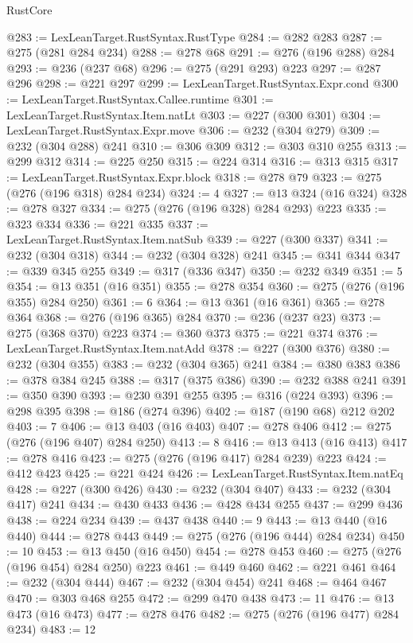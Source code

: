 \begin{lexlean}{RustCore}
\begin{coremodule}
@283 := LexLeanTarget.RustSyntax.RustType
@284 := @282 @283
@287 := @275 (@281 @284 @234)
@288 := @278 @68
@291 := @276 (@196 @288) @284
@293 := @236 (@237 @68)
@296 := @275 (@291 @293) @223
@297 := @287 @296
@298 := @221 @297
@299 := LexLeanTarget.RustSyntax.Expr.cond
@300 := LexLeanTarget.RustSyntax.Callee.runtime
@301 := LexLeanTarget.RustSyntax.Item.natLt
@303 := @227 (@300 @301)
@304 := LexLeanTarget.RustSyntax.Expr.move
@306 := @232 (@304 @279)
@309 := @232 (@304 @288) @241
@310 := @306 @309
@312 := @303 @310 @255
@313 := @299 @312
@314 := @225 @250
@315 := @224 @314
@316 := @313 @315
@317 := LexLeanTarget.RustSyntax.Expr.block
@318 := @278 @79
@323 := @275 (@276 (@196 @318) @284 @234)
@324 := 4
@327 := @13 @324 (@16 @324)
@328 := @278 @327
@334 := @275 (@276 (@196 @328) @284 @293) @223
@335 := @323 @334
@336 := @221 @335
@337 := LexLeanTarget.RustSyntax.Item.natSub
@339 := @227 (@300 @337)
@341 := @232 (@304 @318)
@344 := @232 (@304 @328) @241
@345 := @341 @344
@347 := @339 @345 @255
@349 := @317 (@336 @347)
@350 := @232 @349
@351 := 5
@354 := @13 @351 (@16 @351)
@355 := @278 @354
@360 := @275 (@276 (@196 @355) @284 @250)
@361 := 6
@364 := @13 @361 (@16 @361)
@365 := @278 @364
@368 := @276 (@196 @365) @284
@370 := @236 (@237 @23)
@373 := @275 (@368 @370) @223
@374 := @360 @373
@375 := @221 @374
@376 := LexLeanTarget.RustSyntax.Item.natAdd
@378 := @227 (@300 @376)
@380 := @232 (@304 @355)
@383 := @232 (@304 @365) @241
@384 := @380 @383
@386 := @378 @384 @245
@388 := @317 (@375 @386)
@390 := @232 @388 @241
@391 := @350 @390
@393 := @230 @391 @255
@395 := @316 (@224 @393)
@396 := @298 @395
@398 := @186 (@274 @396)
@402 := @187 (@190 @68) @212 @202
@403 := 7
@406 := @13 @403 (@16 @403)
@407 := @278 @406
@412 := @275 (@276 (@196 @407) @284 @250)
@413 := 8
@416 := @13 @413 (@16 @413)
@417 := @278 @416
@423 := @275 (@276 (@196 @417) @284 @239) @223
@424 := @412 @423
@425 := @221 @424
@426 := LexLeanTarget.RustSyntax.Item.natEq
@428 := @227 (@300 @426)
@430 := @232 (@304 @407)
@433 := @232 (@304 @417) @241
@434 := @430 @433
@436 := @428 @434 @255
@437 := @299 @436
@438 := @224 @234
@439 := @437 @438
@440 := 9
@443 := @13 @440 (@16 @440)
@444 := @278 @443
@449 := @275 (@276 (@196 @444) @284 @234)
@450 := 10
@453 := @13 @450 (@16 @450)
@454 := @278 @453
@460 := @275 (@276 (@196 @454) @284 @250) @223
@461 := @449 @460
@462 := @221 @461
@464 := @232 (@304 @444)
@467 := @232 (@304 @454) @241
@468 := @464 @467
@470 := @303 @468 @255
@472 := @299 @470 @438
@473 := 11
@476 := @13 @473 (@16 @473)
@477 := @278 @476
@482 := @275 (@276 (@196 @477) @284 @234)
@483 := 12

\end{coremodule}
\end{lexlean}
